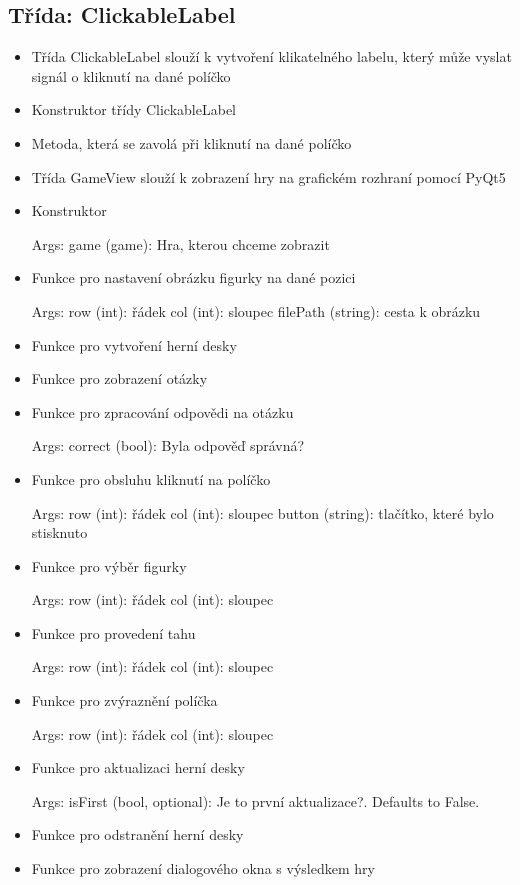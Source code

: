 \documentclass{article}
\begin{document}
\begin{itemize}
 \subsection*{Třída: ClickableLabel}
\begin{itemize}
\item{Třída ClickableLabel slouží k vytvoření klikatelného labelu, který může vyslat signál o kliknutí na dané políčko
    }
\item{Konstruktor třídy ClickableLabel 
        }
\item{Metoda, která se zavolá při kliknutí na dané políčko
        }
\item{Třída GameView slouží k zobrazení hry na grafickém rozhraní pomocí PyQt5
    }
\item{Konstruktor

Args:
    game (game): Hra, kterou chceme zobrazit}
\item{Funkce pro nastavení obrázku figurky na dané pozici

Args:
    row (int): řádek
    col (int): sloupec
    filePath (string): cesta k obrázku}
\item{Funkce pro vytvoření herní desky
        }
\item{Funkce pro zobrazení otázky
        }
\item{Funkce pro zpracování odpovědi na otázku

Args:
    correct (bool): Byla odpověď správná?}
\item{Funkce pro obsluhu kliknutí na políčko

Args:
    row (int): řádek
    col (int): sloupec
    button (string): tlačítko, které bylo stisknuto}
\item{Funkce pro výběr figurky

Args:
    row (int): řádek
    col (int): sloupec}
\item{Funkce pro provedení tahu

Args:
    row (int): řádek
    col (int): sloupec}
\item{Funkce pro zvýraznění políčka

Args:
    row (int): řádek
    col (int): sloupec}
\item{Funkce pro aktualizaci herní desky

Args:
    isFirst (bool, optional): Je to první aktualizace?. Defaults to False.}
\item{Funkce pro odstranění herní desky
        }
\item{Funkce pro zobrazení dialogového okna s výsledkem hry

}
\end{itemize}
\end{itemize}
\end{document}
